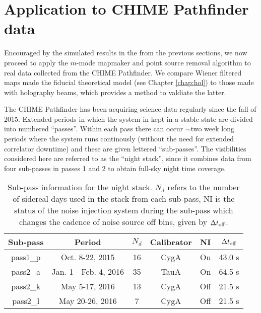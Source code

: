 \section{Application to CHIME Pathfinder data}
\label{ch:mm:sec:pfdata}
Encouraged by the simulated results in the from the previous sections, we now proceed to apply the $m$-mode mapmaker and point source removal algorithm to real data collected from the CHIME Pathfinder. We compare Wiener filtered maps made the fiducial theoretical model (see Chapter \ref{chap:hol}) to those made with holography beams, which provides a method to valdiate the latter.

The CHIME Pathfinder has been acquiring science data regularly since the fall of 2015. Extended periods in which the system in kept in a stable state are divided into numbered ``passes''. Within each pass there can occur $\sim$two week long periods where the system runs continously (without the need for extended correlator downtime) and these are given lettered ``sub-passes''. The visibilities considered here are referred to as the ``night stack'', since it combines data from four sub-passes in passes 1 and 2 to obtain full-sky night time coverage.

\begin{table}[ht]
\begin{center}
\begin{tabular}{| c | c | c | c | c | c |}
\hline
Sub-pass  & Period & $N_d$ & Calibrator & NI & $\Delta t_{\rm off}$ \\ \hline
pass1\_p & Oct. 8-22, 2015 & 16 & CygA & On & 43.0 s \\ \hline
pass2\_a & Jan. 1 - Feb. 4, 2016 & 35 & TauA & On & 64.5 s\\ \hline
pass2\_k & May 5-17, 2016 & 13 & CygA & Off & 21.5 s \\ \hline
pass2\_l  & May 20-26, 2016 & 7 & CygA & Off & 21.5 s \\ \hline
\end{tabular}
\end{center}
\caption{Sub-pass information for the night stack. $N_d$ refers to the number of sidereal days used in the stack from each sub-pass, NI is the status of the noise injection system during the sub-pass which changes the cadence of noise source off bins, given by $\Delta t_{\rm off}$. \label{subpass_table}} 
\end{table}

